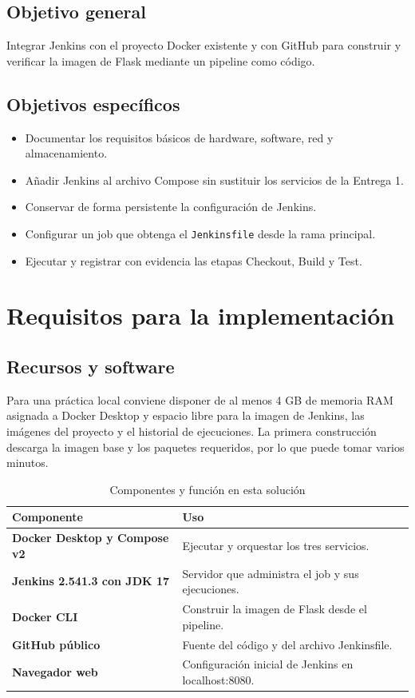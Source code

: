 \documentclass[12pt,a4paper]{article}
\begin{document}
\subsection{Objetivo general}
Integrar Jenkins con el proyecto Docker existente y con GitHub para construir
y verificar la imagen de Flask mediante un pipeline como c\'odigo.

\subsection{Objetivos espec\'ificos}
\begin{itemize}
  \item Documentar los requisitos b\'asicos de hardware, software, red y almacenamiento.
  \item A\~nadir Jenkins al archivo Compose sin sustituir los servicios de la Entrega 1.
  \item Conservar de forma persistente la configuraci\'on de Jenkins.
  \item Configurar un job que obtenga el \texttt{Jenkinsfile} desde la rama principal.
  \item Ejecutar y registrar con evidencia las etapas Checkout, Build y Test.
\end{itemize}

\section{Requisitos para la implementaci\'on}
\subsection{Recursos y software}
Para una pr\'actica local conviene disponer de al menos 4 GB de memoria RAM
asignada a Docker Desktop y espacio libre para la imagen de Jenkins, las im\'agenes
del proyecto y el historial de ejecuciones. La primera construcci\'on descarga
la imagen base y los paquetes requeridos, por lo que puede tomar varios minutos.

\begin{table}[H]
\centering
\caption{Componentes y funci\'on en esta soluci\'on}
\begin{tabularx}{\textwidth}{>{\bfseries}p{3.2cm}X}
\toprule
Componente & Uso \\
\midrule
Docker Desktop y Compose v2 & Ejecutar y orquestar los tres servicios. \\
Jenkins 2.541.3 con JDK 17 & Servidor que administra el job y sus ejecuciones. \\
Docker CLI & Construir la imagen de Flask desde el pipeline. \\
GitHub p\'ublico & Fuente del c\'odigo y del archivo Jenkinsfile. \\
Navegador web & Configuraci\'on inicial de Jenkins en localhost:8080. \\
\bottomrule
\end{tabularx}
\end{table}
\end{document}
